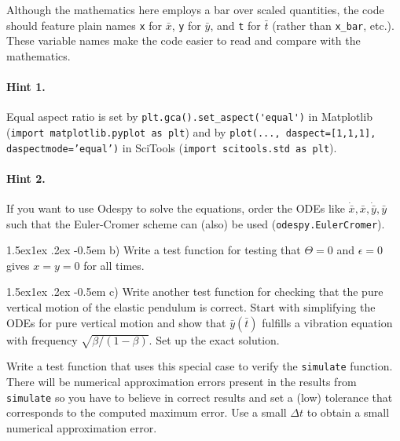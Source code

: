 \documentclass[%
oneside,                 %
final,                   %
10pt]{article}
\makeatletter
\newenvironment{doconceexercise}{}{}
\newcommand\subex{\@startsection{paragraph}{4}{\z@}%
                  {1.5ex\@plus1ex \@minus.2ex}%
                  {-0.5em}%
                  {\normalfont\normalsize\bfseries}}
\makeatother
\begin{document}
\begin{doconceexercise}
Although the mathematics here employs a bar over scaled quantities, the
code should feature plain names \texttt{x} for $\bar x$, \texttt{y} for $\bar y$, and
\texttt{t} for $\bar t$ (rather than \Verb!x_bar!, etc.). These variable names make
the code easier to read and compare with the mathematics.


\paragraph{Hint 1.}
Equal aspect ratio is set by \Verb!plt.gca().set_aspect('equal')! in
Matplotlib (\texttt{import matplotlib.pyplot as plt})
and by \texttt{plot(..., daspect=[1,1,1], daspectmode='equal')}
in SciTools (\texttt{import scitools.std as plt}).



\paragraph{Hint 2.}
If you want to use Odespy to solve the equations, order the ODEs
like $\dot \bar x, \bar x, \dot\bar y,\bar y$ such that the Euler-Cromer
scheme can (also) be used (\texttt{odespy.EulerCromer}).




\subex{b)}
Write a test function for testing that $\Theta=0$ and $\epsilon=0$
gives $x=y=0$ for all times.



\subex{c)}
Write another test function for checking that the pure vertical
motion of the elastic pendulum is correct.
Start with simplifying the ODEs for pure vertical motion and show that
$\bar y(\bar t)$ fulfills a vibration equation with
frequency $\sqrt{\beta/(1-\beta)}$. Set up the exact solution.

Write a test function that
uses this special case to verify the \texttt{simulate} function. There will
be numerical approximation errors present in the results from
\texttt{simulate} so you have to believe in correct results and set a
(low) tolerance that corresponds to the computed maximum error.
Use a small $\Delta t$ to obtain a small numerical approximation error.



\end{doconceexercise}
\end{document}
